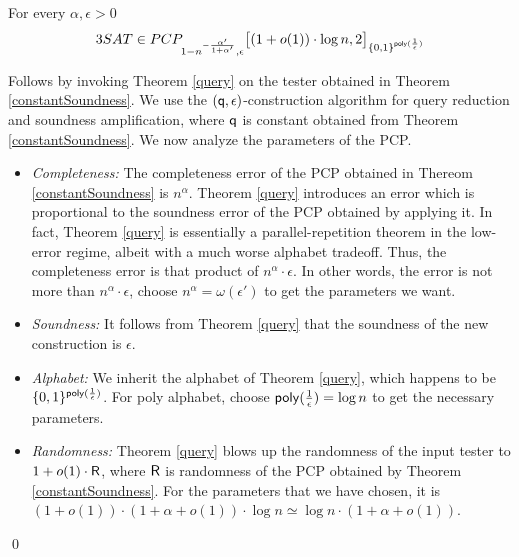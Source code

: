 \begin{theorem}\label{main} 
For every $\alpha , \epsilon > 0$
\[
  3SAT \in PCP_{{1 - {n^{-\frac{\alpha'} {1 + \alpha'}}}}, \epsilon } \big[ (1 + o(1)) \cdot \log n,  2 \big ]_{\{0,1\}^{{\sf poly}(\frac{1}{\epsilon})}}
\]

\end{theorem}
 Follows by invoking Theorem \ref{query} on the
tester obtained in Theorem \ref{constantSoundness}. We 
use the $( {\sf q}, \epsilon)$-construction algorithm for query
reduction and soundness amplification, where ${\sf q}$ is constant obtained
from Theorem \ref{constantSoundness}. We now analyze the parameters
of the PCP.
\begin{itemize}

\item {\em Completeness:} The completeness error of the PCP
  obtained in Thereom \ref{constantSoundness} is $n^\alpha$. Theorem \ref{query}
  introduces an error which is proportional to the soundness error of
  the PCP obtained by applying it. In fact, Theorem \ref{query} is
  essentially a parallel-repetition theorem in the low-error regime,
  albeit with a much worse alphabet tradeoff. Thus, the completeness
  error is that product of $n^\alpha \cdot \epsilon$. In other words,
  the error is not more than $n^{\alpha} \cdot \epsilon$, choose $ n^\alpha =
  \omega(\epsilon')$ to get the parameters we want.

\item {\em Soundness:} It follows from Theorem \ref{query} that the
  soundness of the new construction is $\epsilon$.

\item {\em Alphabet:} We inherit the alphabet of Theorem \ref{query},
  which happens to be $\{0,1\}^{{\sf poly}(\frac{1}{\epsilon})}$.
For poly alphabet, choose ${{\sf poly}(\frac{1}{\epsilon})} = \log n$ to get the 
necessary parameters.

\item {\em Randomness:} Theorem \ref{query} blows up the randomness of
  the input tester to ${1 + o(1)} \cdot {\sf R}$, where ${\sf R}$ is
  randomness of the PCP obtained by Theorem \ref{constantSoundness}. For the
  parameters that we have chosen, it is $(1 + o(1))  \cdot (1 + \alpha + o(1)) \cdot \log n   
\simeq  \log n \cdot (1 +  \alpha + o(1))$.
\end{itemize}
\qed

